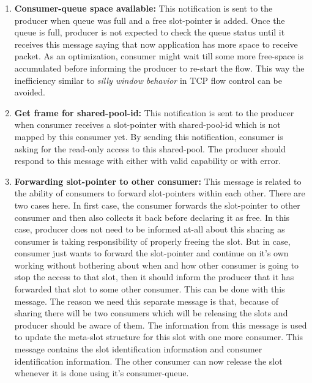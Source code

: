 \documentclass[a4paper,twoside]{report} %
\begin{document}
\begin{enumerate} 
  \item \textbf{Consumer-queue space available:} This notification is
  sent to the producer when queue was full and a free slot-pointer is
  added.  Once the queue is full, producer is not expected to check
  the queue status until it receives this message saying that now
  application has more space to receive packet.  As an optimization,
  consumer might wait till some more free-space is accumulated before
  informing the producer to re-start the flow.  This way the
  inefficiency similar to \textit{silly window behavior} in TCP 
  flow control can be avoided.

  \item \textbf{Get frame for shared-pool-id:} This notification is
  sent to the producer when consumer receives a slot-pointer with 
  shared-pool-id which is not mapped by this consumer yet.  By
  sending this notification, consumer is asking for the read-only
  access to this shared-pool.  The producer should respond to
  this message with either with valid capability or with error.

  \item \textbf{Forwarding slot-pointer to other consumer:}  This
  message is related to the ability of consumers to forward
  slot-pointers within each other.  There are two cases here.  In
  first case, the consumer forwards the slot-pointer to other 
  consumer and then also collects it back before declaring it as free.
  In this case, producer does not need to be informed at-all about
  this sharing as consumer is taking responsibility of properly
  freeing the slot.  But in case, consumer just wants to forward the
  slot-pointer and continue on it's own working without bothering
  about when and how other consumer is going to stop the access to
  that slot, then it should inform the producer that it has forwarded
  that slot to some other consumer.  This can be done with this
  message.  The reason we need this separate message is that, 
  because of sharing there will be two consumers which will be 
  releasing the slots and producer should be aware of them.  
  The information from this message is used to update the 
  meta-slot structure for this slot with one more consumer.
  This message contains the slot identification information
  and consumer identification information.  The other consumer can 
  now release the slot whenever it is done using it's consumer-queue.  



\end{enumerate}
\end{document}

